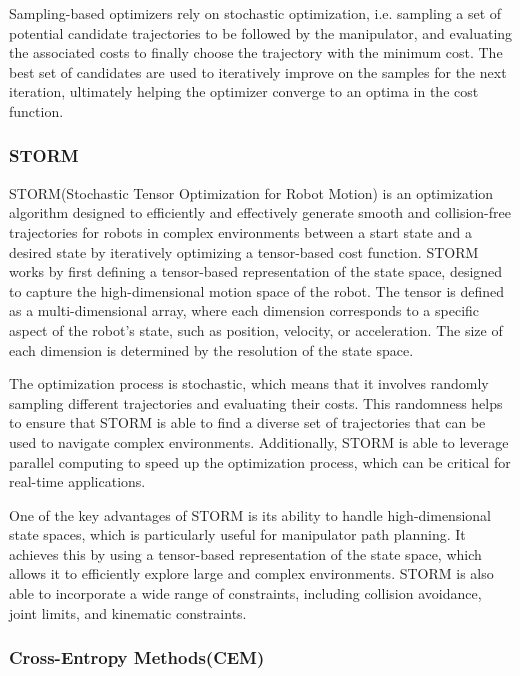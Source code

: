 Sampling-based optimizers rely on stochastic optimization, i.e. sampling a set of potential candidate trajectories to be followed by the manipulator, and evaluating the associated costs to finally choose the trajectory with the minimum cost. The best set of candidates are used to iteratively improve on the samples for the next iteration, ultimately helping the optimizer converge to an optima in the cost function. 

\subsubsection{STORM}

STORM(Stochastic Tensor Optimization for Robot Motion)\cite{STORM} is an optimization algorithm designed to efficiently and effectively generate smooth and collision-free trajectories for robots in complex environments between a start state and a desired state by iteratively optimizing a tensor-based cost function. STORM works by first defining a tensor-based representation of the state space, designed to capture the high-dimensional motion space of the robot. The tensor is defined as a multi-dimensional array, where each dimension corresponds to a specific aspect of the robot's state, such as position, velocity, or acceleration. The size of each dimension is determined by the resolution of the state space.

The optimization process is stochastic, which means that it involves randomly sampling different trajectories and evaluating their costs. This randomness helps to ensure that STORM is able to find a diverse set of trajectories that can be used to navigate complex environments. Additionally, STORM is able to leverage parallel computing to speed up the optimization process, which can be critical for real-time applications.

One of the key advantages of STORM is its ability to handle high-dimensional state spaces, which is particularly useful for manipulator path planning. It achieves this by using a tensor-based representation of the state space, which allows it to efficiently explore large and complex environments. STORM is also able to incorporate a wide range of constraints, including collision avoidance, joint limits, and kinematic constraints.

\subsubsection{Cross-Entropy Methods(CEM)}

